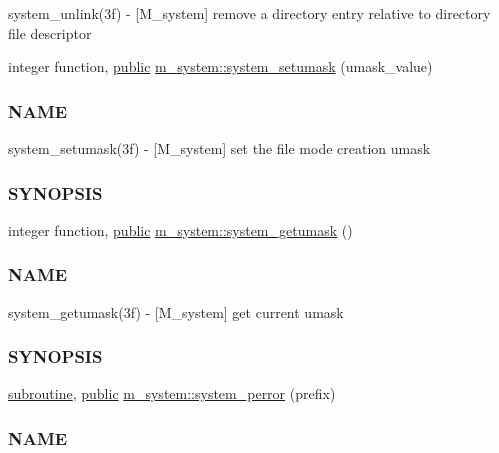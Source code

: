 \begin{DoxyCompactItemize}
\begin{DoxyCompactList}
system\+\_\+unlink(3f) -\/ \mbox{[}M\+\_\+system\mbox{]} remove a directory entry relative to directory file descriptor \end{DoxyCompactList}\item 
integer function, \hyperlink{M__stopwatch_83_8txt_a2f74811300c361e53b430611a7d1769f}{public} \hyperlink{namespacem__system_a04fd02e6f5ce2f8ecdfb577e1490feba}{m\+\_\+system\+::system\+\_\+setumask} (umask\+\_\+value)
\begin{DoxyCompactList}\small\item\em \subsubsection*{N\+A\+ME}

system\+\_\+setumask(3f) -\/ \mbox{[}M\+\_\+system\mbox{]} set the file mode creation umask \subsubsection*{S\+Y\+N\+O\+P\+S\+IS}\end{DoxyCompactList}\item 
integer function, \hyperlink{M__stopwatch_83_8txt_a2f74811300c361e53b430611a7d1769f}{public} \hyperlink{namespacem__system_aa9ca951be39d2ea738d627cf42c00ddd}{m\+\_\+system\+::system\+\_\+getumask} ()
\begin{DoxyCompactList}\small\item\em \subsubsection*{N\+A\+ME}

system\+\_\+getumask(3f) -\/ \mbox{[}M\+\_\+system\mbox{]} get current umask \subsubsection*{S\+Y\+N\+O\+P\+S\+IS}\end{DoxyCompactList}\item 
\hyperlink{M__stopwatch_83_8txt_acfbcff50169d691ff02d4a123ed70482}{subroutine}, \hyperlink{M__stopwatch_83_8txt_a2f74811300c361e53b430611a7d1769f}{public} \hyperlink{namespacem__system_afae451a1fc5432274dc1f75a364051b4}{m\+\_\+system\+::system\+\_\+perror} (prefix)
\begin{DoxyCompactList}\small\item\em \subsubsection*{N\+A\+ME}


\end{DoxyCompactList}
\end{DoxyCompactItemize}

